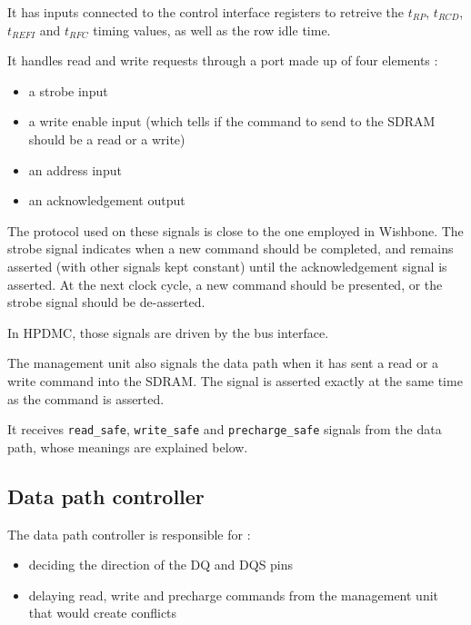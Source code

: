 \documentclass[a4paper,11pt]{article}
\begin{document}
It has inputs connected to the control interface registers to retreive the $t_{RP}$, $t_{RCD}$, $t_{REFI}$ and $t_{RFC}$ timing values, as well as the row idle time.

It handles read and write requests through a port made up of four elements :
\begin{itemize}
\item a strobe input
\item a write enable input (which tells if the command to send to the SDRAM should be a read or a write)
\item an address input
\item an acknowledgement output
\end{itemize}

The protocol used on these signals is close to the one employed in Wishbone. The strobe signal indicates when a new command should be completed, and remains asserted (with other signals kept constant) until the acknowledgement signal is asserted. At the next clock cycle, a new command should be presented, or the strobe signal should be de-asserted.

In HPDMC, those signals are driven by the bus interface.

The management unit also signals the data path when it has sent a read or a write command into the SDRAM. The signal is asserted exactly at the same time as the command is asserted.

It receives \verb!read_safe!, \verb!write_safe! and \verb!precharge_safe! signals from the data path, whose meanings are explained below.

\subsection{Data path controller}
The data path controller is responsible for :
\begin{itemize}
\item deciding the direction of the DQ and DQS pins
\item delaying read, write and precharge commands from the management unit that would create conflicts
\end{itemize}
\end{document}

